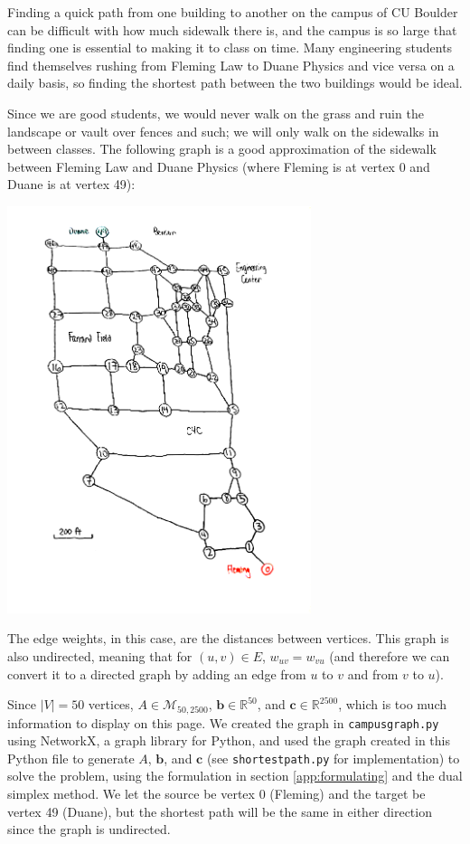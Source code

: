 Finding a quick path from one building to another on the campus of CU Boulder can be difficult with how much sidewalk there is, and the campus is so large that finding one is essential to making it to class on time. Many engineering students find themselves rushing from Fleming Law to Duane Physics and vice versa on a daily basis, so finding the shortest path between the two buildings would be ideal.

Since we are good students, we would never walk on the grass and ruin the landscape or vault over fences and such; we will only walk on the sidewalks in between classes. The following graph is a good approximation of the sidewalk between Fleming Law and Duane Physics (where Fleming is at vertex 0 and Duane is at vertex 49):

\begin{center}
    \includegraphics[width=3.5in]{map}
\end{center}

The edge weights, in this case, are the distances between vertices. This graph is also undirected, meaning that for $(u,v) \in E$, $w_{uv} = w_{vu}$ (and therefore we can convert it to a directed graph by adding an edge from $u$ to $v$ and from $v$ to $u$).

Since $|V| = 50$ vertices, $A \in \mathcal{M}_{50,2500}$, $\mathbf{b} \in \mathbb{R}^{50}$, and $\mathbf{c} \in \mathbb{R}^{2500}$, which is too much information to display on this page. We created the graph in \texttt{campusgraph.py} using NetworkX, a graph library for Python, and used the graph created in this Python file to generate $A$, $\mathbf{b}$, and $\mathbf{c}$ (see \texttt{shortestpath.py} for implementation) to solve the problem, using the formulation in section \ref{app:formulating} and the dual simplex method. We let the source be vertex 0 (Fleming) and the target be vertex 49 (Duane), but the shortest path will be the same in either direction since the graph is undirected.

